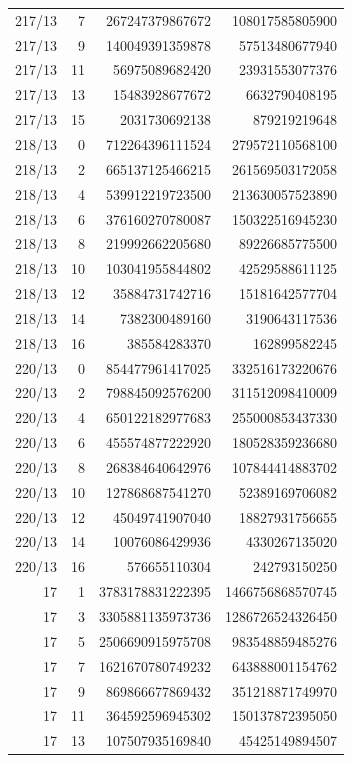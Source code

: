 \begin{longtable}{@{}rrrr@{}}
217/13 & 7 & 267247379867672 & 108017585805900\\
217/13 & 9 & 140049391359878 & 57513480677940\\
217/13 & 11 & 56975089682420 & 23931553077376\\
217/13 & 13 & 15483928677672 & 6632790408195\\
217/13 & 15 & 2031730692138 & 879219219648\\
218/13 & 0 & 712264396111524 & 279572110568100\\
218/13 & 2 & 665137125466215 & 261569503172058\\
218/13 & 4 & 539912219723500 & 213630057523890\\
218/13 & 6 & 376160270780087 & 150322516945230\\
218/13 & 8 & 219992662205680 & 89226685775500\\
218/13 & 10 & 103041955844802 & 42529588611125\\
218/13 & 12 & 35884731742716 & 15181642577704\\
218/13 & 14 & 7382300489160 & 3190643117536\\
218/13 & 16 & 385584283370 & 162899582245\\
220/13 & 0 & 854477961417025 & 332516173220676\\
220/13 & 2 & 798845092576200 & 311512098410009\\
220/13 & 4 & 650122182977683 & 255000853437330\\
220/13 & 6 & 455574877222920 & 180528359236680\\
220/13 & 8 & 268384640642976 & 107844414883702\\
220/13 & 10 & 127868687541270 & 52389169706082\\
220/13 & 12 & 45049741907040 & 18827931756655\\
220/13 & 14 & 10076086429936 & 4330267135020\\
220/13 & 16 & 576655110304 & 242793150250\\
17 & 1 & 3783178831222395 & 1466756868570745\\
17 & 3 & 3305881135973736 & 1286726524326450\\
17 & 5 & 2506690915975708 & 983548859485276\\
17 & 7 & 1621670780749232 & 643888001154762\\
17 & 9 & 869866677869432 & 351218871749970\\
17 & 11 & 364592596945302 & 150137872395050\\
17 & 13 & 107507935169840 & 45425149894507\\

\end{longtable}
